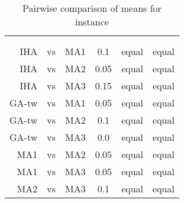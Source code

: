 \documentclass[thesis.tex]{subfiles}
\newcommand{\CurrentInstance}{}
\newcommand{\CurrentInstanceFileEscaped}{}
\newcommand{\CurrentInstanceTexEscaped}{}
\begin{document}
\begin{table}[htbp]
   \caption{Pairwise comparison of means for instance \CurrentInstance}
   \label{fig:\CurrentInstanceFileEscaped-mannwhitneyu}
   \centering\small
      \begin{tabular}{r@{\ }c@{\ }l S[table-format=2.2] c c} \toprule
         &&&                          &  \\ \cmidrule(lr){5-6}
         &&&  &  &  \\ \midrule

         \gls{IHA} &vs& \gls{MA1}   &  0.1  &  equal   &  equal   \\
         \gls{IHA} &vs& \gls{MA2}   &  0.05 &  equal   &  equal   \\
         \gls{IHA} &vs& \gls{MA3}   &  0.15 &  equal   &  equal   \\
         \gls{GA-tw} &vs& \gls{MA1} &  0.05 &  equal   &  equal   \\
         \gls{GA-tw} &vs& \gls{MA2} &  0.1  &  equal   &  equal   \\
         \gls{GA-tw} &vs& \gls{MA3} &  0.0  &  equal   &  equal   \\
         \gls{MA1} &vs& \gls{MA2}   &  0.05 &  equal   &  equal   \\
         \gls{MA1} &vs& \gls{MA3}   &  0.05 &  equal   &  equal   \\
         \gls{MA2} &vs& \gls{MA3}   &  0.1  &  equal   &  equal   \\
         \bottomrule
      \end{tabular}
\end{table}
   \renewcommand{\CurrentInstance}{\Instance{water}}
   \renewcommand{\CurrentInstanceFileEscaped}{water}
   \renewcommand{\CurrentInstanceTexEscaped}{water}


   \renewcommand{\CurrentInstance}{\Instance{munin1}}
   \renewcommand{\CurrentInstanceFileEscaped}{munin1}
   \renewcommand{\CurrentInstanceTexEscaped}{munin1}


\end{document}
